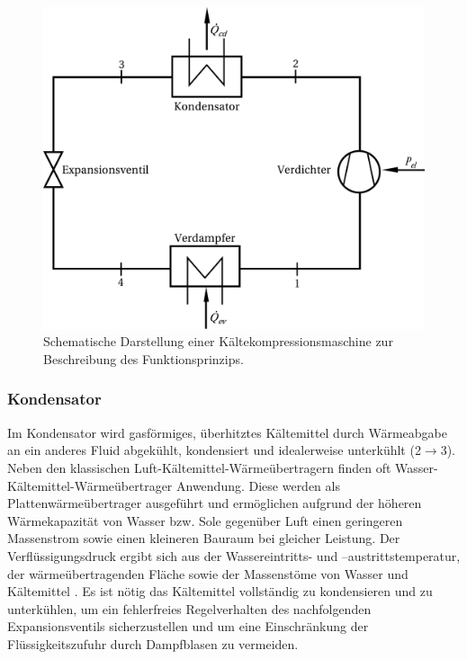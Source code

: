 \begin{figure} [!htb]
\centering
\includegraphics[scale=.6]{Pictures/Ersatzschaltbild.pdf}
\caption{Schematische Darstellung einer Kältekompressionsmaschine zur Beschreibung des Funktionsprinzips.}
\label{fig:Ersatzschaltbild}
\end{figure}




\subsubsection{Kondensator}
\label{subsubsec:Kondensator}

Im Kondensator wird gasförmiges, überhitztes Kältemittel durch Wärmeabgabe an ein anderes Fluid abgekühlt, kondensiert und idealerweise unterkühlt (2$\longrightarrow$3). Neben den klassischen Luft-Kältemittel-Wärmeübertragern finden oft Wasser-Kältemittel-Wärmeübertrager Anwendung. Diese werden als Plattenwärmeübertrager ausgeführt und ermöglichen aufgrund der höheren Wärmekapazität von Wasser bzw. Sole gegenüber Luft  einen geringeren Massenstrom sowie einen kleineren Bauraum bei gleicher Leistung. Der Verflüssigungsdruck ergibt sich aus der Wassereintritts- und –austrittstemperatur, der wärmeübertragenden Fläche sowie der Massenstöme von Wasser und Kältemittel \cite{Kulterer.2007}. Es ist nötig das Kältemittel vollständig zu kondensieren und zu unterkühlen, um ein fehlerfreies Regelverhalten des nachfolgenden Expansionsventils sicherzustellen und um eine Einschränkung der Flüssigkeitszufuhr durch Dampfblasen zu vermeiden.

